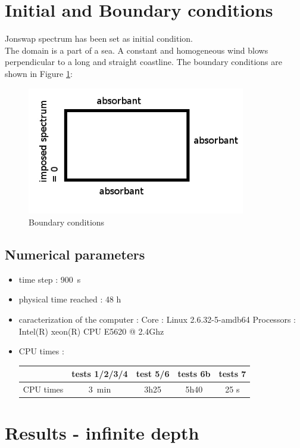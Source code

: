 \section{Initial and Boundary conditions}
Jonswap spectrum has been set as initial condition.\\
The domain is a part of a sea. A constant and homogeneous wind blows perpendicular to a long and straight coastline. The boundary conditions are shown in Figure \ref{boundaryfet}:
\begin{figure}
\centering
\includegraphics[width=0.85\textwidth]{boundarycond.jpg}
\caption{Boundary conditions}
\label{boundaryfet}
\end{figure}
\subsection{Numerical parameters}
\begin{itemize}
\item time step : 900~s
\item physical time reached : 48 h
\item caracterization of the computer : \subitem Core : Linux 2.6.32-5-amdb64 \subitem Processors : Intel(R)
xeon(R) CPU E5620 @ 2.4Ghz
\item CPU times : \\
\begin{tabular}{ccccc}
\toprule
\toprule
 & \textbf{tests 1/2/3/4} & \textbf{test 5/6} & \textbf{tests 6b} & \textbf{tests 7}\\
\midrule
CPU times & 3~min & 3h25 & 5h40 & 25 s \\
\bottomrule
\bottomrule
\end{tabular}
\end{itemize}

\section{Results - infinite depth }
